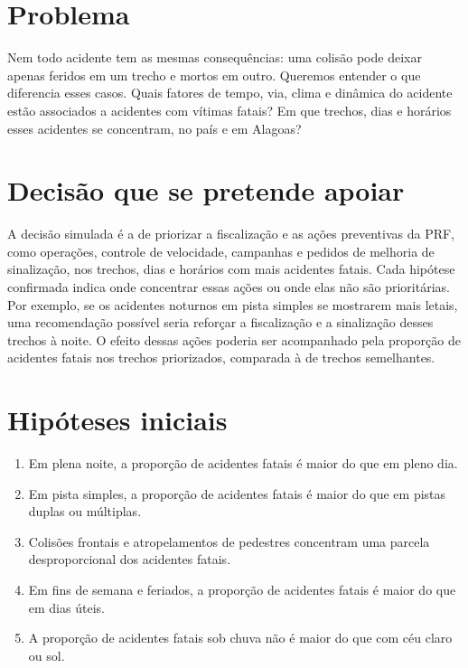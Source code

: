 \documentclass[11pt,a4paper]{article}
\begin{document}
\section*{Problema}

Nem todo acidente tem as mesmas consequências: uma colisão pode deixar apenas feridos em um trecho e mortos em outro. Queremos entender o que diferencia esses casos. Quais fatores de tempo, via, clima e dinâmica do acidente estão associados a acidentes com vítimas fatais? Em que trechos, dias e horários esses acidentes se concentram, no país e em Alagoas?

\section*{Decisão que se pretende apoiar}

A decisão simulada é a de priorizar a fiscalização e as ações preventivas da PRF, como operações, controle de velocidade, campanhas e pedidos de melhoria de sinalização, nos trechos, dias e horários com mais acidentes fatais. Cada hipótese confirmada indica onde concentrar essas ações ou onde elas não são prioritárias. Por exemplo, se os acidentes noturnos em pista simples se mostrarem mais letais, uma recomendação possível seria reforçar a fiscalização e a sinalização desses trechos à noite. O efeito dessas ações poderia ser acompanhado pela proporção de acidentes fatais nos trechos priorizados, comparada à de trechos semelhantes.

\section*{Hipóteses iniciais}

\begin{enumerate}[label=\textbf{H\arabic*.}]
  \item Em plena noite, a proporção de acidentes fatais é maior do que em pleno dia.
  \item Em pista simples, a proporção de acidentes fatais é maior do que em pistas duplas ou múltiplas.
  \item Colisões frontais e atropelamentos de pedestres concentram uma parcela desproporcional dos acidentes fatais.
  \item Em fins de semana e feriados, a proporção de acidentes fatais é maior do que em dias úteis.
  \item A proporção de acidentes fatais sob chuva não é maior do que com céu claro ou sol.
\end{enumerate}
\end{document}
